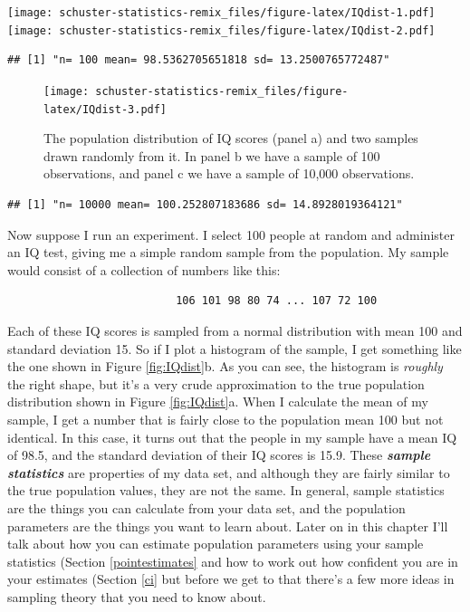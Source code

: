 \documentclass[
]{book}
\begin{document}
\texttt{[image: schuster-statistics-remix\_files/figure-latex/IQdist-1.pdf]} \texttt{[image: schuster-statistics-remix\_files/figure-latex/IQdist-2.pdf]}

\begin{verbatim}
## [1] "n= 100 mean= 98.5362705651818 sd= 13.2500765772487"
\end{verbatim}

\begin{figure}
\centering
\texttt{[image: schuster-statistics-remix\_files/figure-latex/IQdist-3.pdf]}
\caption{\label{fig:IQdist-3}The population distribution of IQ scores (panel a) and two samples drawn randomly from it. In panel b we have a sample of 100 observations, and panel c we have a sample of 10,000 observations.}
\end{figure}

\begin{verbatim}
## [1] "n= 10000 mean= 100.252807183686 sd= 14.8928019364121"
\end{verbatim}

Now suppose I run an experiment. I select 100 people at random and administer an IQ test, giving me a simple random sample from the population. My sample would consist of a collection of numbers like this:

\begin{verbatim}
                          106 101 98 80 74 ... 107 72 100
\end{verbatim}

Each of these IQ scores is sampled from a normal distribution with mean 100 and standard deviation 15. So if I plot a histogram of the sample, I get something like the one shown in Figure \ref{fig:IQdist}b. As you can see, the histogram is \emph{roughly} the right shape, but it's a very crude approximation to the true population distribution shown in Figure \ref{fig:IQdist}a. When I calculate the mean of my sample, I get a number that is fairly close to the population mean 100 but not identical. In this case, it turns out that the people in my sample have a mean IQ of 98.5, and the standard deviation of their IQ scores is 15.9. These \textbf{\emph{sample statistics}} are properties of my data set, and although they are fairly similar to the true population values, they are not the same. In general, sample statistics are the things you can calculate from your data set, and the population parameters are the things you want to learn about. Later on in this chapter I'll talk about how you can estimate population parameters using your sample statistics (Section \ref{pointestimates} and how to work out how confident you are in your estimates (Section \ref{ci} but before we get to that there's a few more ideas in sampling theory that you need to know about.
\end{document}
